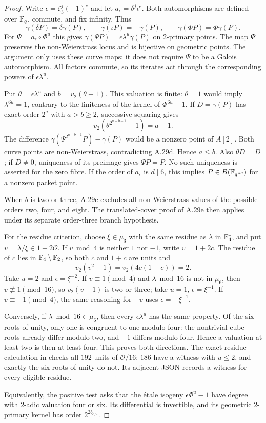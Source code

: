 \begin{proof}
Write $\epsilon=\zeta_3^j(-1)^e$ and let
$a_\epsilon=\delta^j\iota^e$. Both automorphisms are
defined over $\mathbb F_q$, commute, and fix infinity. Thus
\[
 \gamma(\delta P)=\delta\gamma(P),\qquad
 \gamma(\iota P)=-\gamma(P),\qquad
 \gamma(\Phi P)=\Phi\gamma(P).
\]
For $\Psi=a_\epsilon\circ\Phi^u$ this gives
$\gamma(\Psi P)=\epsilon\lambda^u\gamma(P)$ on
$2$-primary points. The map $\Psi$ preserves the
non-Weierstrass locus and is bijective on geometric
points. The argument only uses these curve maps;
it does not require $\Psi$ to be a Galois automorphism.
All factors commute, so its iterates act through
the corresponding powers of $\epsilon\lambda^u$.

Put $\theta=\epsilon\lambda^u$ and $b=v_2(\theta-1)$.
This valuation is finite: $\theta=1$ would imply
$\lambda^{6u}=1$, contrary to the finiteness of the
kernel of $\Phi^{6u}-1$. If $D=\gamma(P)$ has exact
order $2^a$ with $a>b\ge2$, successive squaring gives
\[
 v_2(\theta^{2^{a-b-1}}-1)=a-1.
\]
The difference
$\gamma(\Psi^{2^{a-b-1}}P)-\gamma(P)$ would be a
nonzero point of $A[2]$. Both curve points are
non-Weierstrass, contradicting A.29d. Hence $a\le b$.
Also $\theta D=D$; if $D\ne0$, uniqueness of its
preimage gives $\Psi P=P$. No such uniqueness is
asserted for the zero fibre. If the order of
$a_\epsilon$ is $d\mid6$, this implies
$P\in B(\mathbb F_{q^{ud}})$ for a nonzero packet point.

When $b$ is two or three, A.29e excludes all
non-Weierstrass values of the possible orders
two, four, and eight. The translated-cover proof
of A.29e then applies under its separate order-three
branch hypothesis.

For the residue criterion, choose $\xi\in\mu_3$
with the same residue as $\lambda$ in $\mathbb F_4^*$,
and put $v=\lambda/\xi\in1+2\mathcal O$.
If $v\bmod4$ is neither $1$ nor $-1$, write
$v=1+2c$. The residue of $c$ lies in
$\mathbb F_4\setminus\mathbb F_2$, so both $c$ and $1+c$ are
units and
\[
 v_2(v^2-1)=v_2(4c(1+c))=2.
\]
Take $u=2$ and $\epsilon=\xi^{-2}$.
If $v\equiv1\pmod4$ and $\lambda\bmod16$ is
not in $\mu_6$, then $v\not\equiv1\pmod{16}$,
so $v_2(v-1)$ is two or three; take
$u=1$, $\epsilon=\xi^{-1}$. If
$v\equiv-1\pmod4$, the same reasoning for $-v$
uses $\epsilon=-\xi^{-1}$.

Conversely, if $\lambda\bmod16\in\mu_6$, then
every $\epsilon\lambda^u$ has the same property.
Of the six roots of unity, only one is congruent
to one modulo four: the nontrivial cube roots
already differ modulo two, and $-1$ differs
modulo four. Hence a valuation at least two is
then at least four. This proves both directions.
The exact residue calculation in
checks all $192$ units of $\mathcal O/16$:
$186$ have a witness with $u\le2$, and exactly
the six roots of unity do not. Its adjacent JSON
records a witness for every eligible residue.

Equivalently, the positive test asks that the
\'{e}tale isogeny $\epsilon\Phi^u-1$ have degree
with $2$-adic valuation four or six. Its differential
is invertible, and its geometric $2$-primary kernel
has order $2^{2b_{\epsilon,u}}$.
\end{proof}

